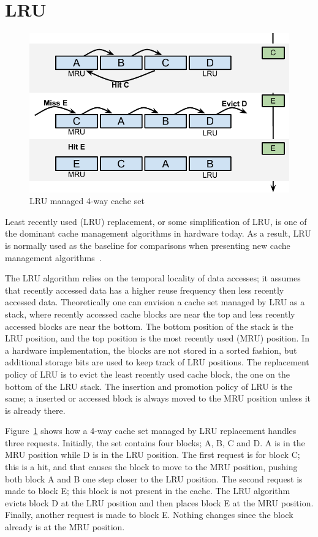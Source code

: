 
\section{LRU}
\label{sec:algorithms:lru}


\begin{figure}[ht]
    \centering
    \includegraphics[width=\textwidth]{figures/algorithms/LRU}
    \caption{LRU managed 4-way cache set}
    \label{fig:algorithms:lru_example}
\end{figure}

Least recently used (LRU) replacement, or some simplification of LRU, is one of the dominant cache management algorithms in hardware today. 
As a result, LRU is normally used as the baseline for comparisons when presenting new cache management algorithms~\cite{Jaleel2010,Qureshi2006,Qureshi2007}.

The LRU algorithm relies on the temporal locality of data accesses; it assumes that recently accessed data has a higher reuse frequency then less recently accessed data.
Theoretically one can envision a cache set managed by LRU as a stack, where recently accessed cache blocks are near the top and less recently accessed blocks are near the bottom.
The bottom position of the stack is the LRU position, and the top position is the most recently used (MRU) position.
In a hardware implementation, the blocks are not stored in a sorted fashion, but additional storage bits are used to keep track of LRU positions.
The replacement policy of LRU is to evict the least recently used cache block, the one on the bottom of the LRU stack.
The insertion and promotion policy of LRU is the same; a inserted or accessed block is always moved to the MRU position unless it is already there.

Figure~\ref{fig:algorithms:lru_example} shows how a 4-way cache set managed by LRU replacement handles three requests. 
Initially, the set contains four blocks; A, B, C and D. 
A is in the MRU position while D is in the LRU position.
The first request is for block C; this is a hit, and that causes the block to move to the MRU position, pushing both block A and B one step closer to the LRU position.
The second request is made to block E; this block is not present in the cache.
The LRU algorithm evicts block D at the LRU position and then places block E at the MRU position.
Finally, another request is made to block E. Nothing changes since the block already is at the MRU position.

